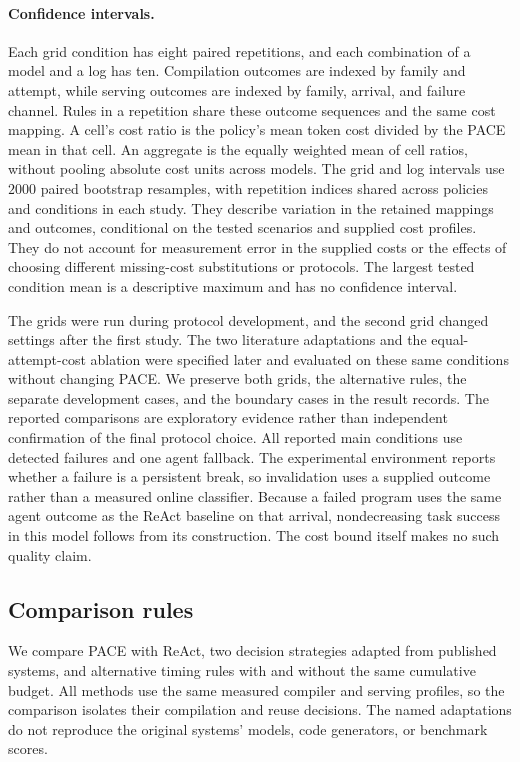 \paragraph{Confidence intervals.}
Each grid condition has eight paired repetitions, and each combination of a model and a log has ten.
Compilation outcomes are indexed by family and attempt, while serving outcomes are indexed by family, arrival, and failure channel.
Rules in a repetition share these outcome sequences and the same cost mapping.
A cell's cost ratio is the policy's mean token cost divided by the PACE mean in that cell.
An aggregate is the equally weighted mean of cell ratios, without pooling absolute cost units across models.
The grid and log intervals use $2000$ paired bootstrap resamples, with repetition indices shared across policies and conditions in each study.
They describe variation in the retained mappings and outcomes, conditional on the tested scenarios and supplied cost profiles.
They do not account for measurement error in the supplied costs or the effects of choosing different missing-cost substitutions or protocols.
The largest tested condition mean is a descriptive maximum and has no confidence interval.

The grids were run during protocol development, and the second grid changed settings after the first study.
The two literature adaptations and the equal-attempt-cost ablation were specified later and evaluated on these same conditions without changing PACE.
We preserve both grids, the alternative rules, the separate development cases, and the boundary cases in the result records.
The reported comparisons are exploratory evidence rather than independent confirmation of the final protocol choice.
All reported main conditions use detected failures and one agent fallback.
The experimental environment reports whether a failure is a persistent break, so invalidation uses a supplied outcome rather than a measured online classifier.
Because a failed program uses the same agent outcome as the ReAct baseline on that arrival, nondecreasing task success in this model follows from its construction.
The cost bound itself makes no such quality claim.

\subsection{Comparison rules}\label{app:baselines}
\label{sec:baselines}

We compare PACE with ReAct, two decision strategies adapted from published systems, and alternative timing rules with and without the same cumulative budget.
All methods use the same measured compiler and serving profiles, so the comparison isolates their compilation and reuse decisions.
The named adaptations do not reproduce the original systems' models, code generators, or benchmark scores.

